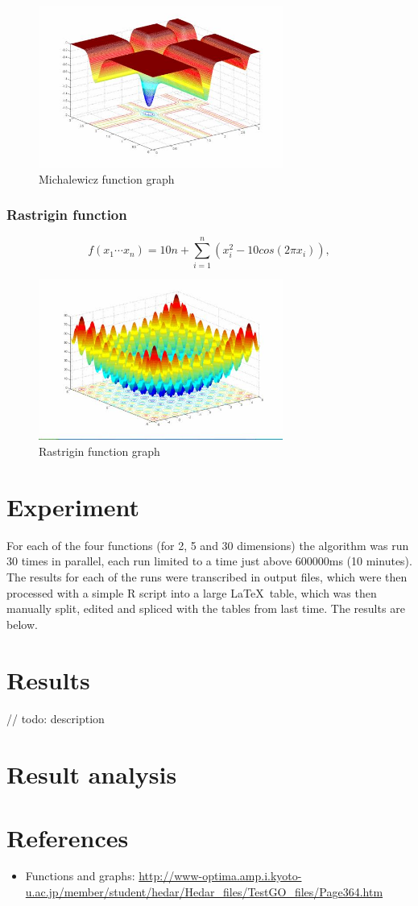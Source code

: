 \documentclass{article}
\begin{document}
	\begin{figure}[!h]
		\includegraphics[height=150pt,keepaspectratio]{images/michalewicz-graph.jpg}
		\caption{Michalewicz function graph}
	\end{figure}

	\subsubsection{Rastrigin function}
	$$f(x_1 \cdots x_n) = 10n + \sum_{i=1}^n (x_i^2 -10cos(2\pi x_i)),$$

	\begin{figure}[!h]
		\includegraphics[height=150pt,keepaspectratio]{images/rastrigin-graph.jpg}
		\caption{Rastrigin function graph}
	\end{figure}
	
	\section{Experiment}
	For each of the four functions (for 2, 5 and 30 dimensions) the algorithm was run 30 times in parallel, each run limited to a time just above 600000ms (10 minutes). The results for each of the runs were transcribed in output files, which were then processed with a simple R script into a large \LaTeX\ table, which was then manually split, edited and spliced with the tables from last time. The results are below.
    \section{Results}
    \paragraph{}
    // todo: description

    \section{Result analysis}

    \section{References}
    \begin{itemize}
        \item Functions and graphs: \url{http://www-optima.amp.i.kyoto-u.ac.jp/member/student/hedar/Hedar_files/TestGO_files/Page364.htm}
    \end{itemize}
\end{document}
